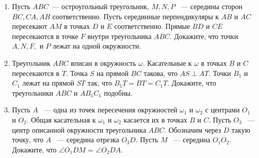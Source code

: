 \documentclass{article}
\begin{document}
\begin{enumerate}[label*=\protect\fbox{\arabic{enumi}}]
\item Пусть $ ABC $~--- остроугольный треугольник, $  M, N, P $ ~--- середины сторон $ BC, CA, AB  $ соответственно. Пусть серединные перпендикуляры к $ AB $ и $ AC $ пересекают $ AM $ в точках $ D $ и $ E $ соответственно. Прямые $ BD $ и $ CE $ пересекаются в точке $ F $ внутри треугольника $ ABC $. Докажите, что точки $ A, N, F,  $ и $ P $ лежат на одной окружности.
\item Треугольник $ ABC $ вписан в окружность $\omega$. Касательные к $\omega$ в точках $ B $ и $ C $ пересекаются в $ T $. Точка $ S $ на прямой $ BC $ такова, что $ AS \perp AT $. Точки $ B_1 $ и $ C_1 $ лежат на прямой $ ST $ так, что $ B_1T  = BT = C_1T$. Докажите, что треугольники $ ABC $ и $ AB_1C_1 $ подобны.
\item Пусть $ A $ ~--- одна из точек пересечения окружностей $ \omega_1 $ и $ \omega_2 $ с центрами $ O_1 $ и $ O_2 $. Общая касательная к $\omega_1$ и $\omega_2$ касается их в точках $ B $ и $ C $. Пусть $ O_3 $ ~--- центр описанной окружности треугольника $ ABC $. Обозначим через $ D $ такую точку, что $ A $ ~--- середина отрезка $ O_3D $. Пусть $ M $ ~--- середина $ O_1O_2 $. Докажите, что $ \angle O_1DM $ = $ \angle O_2DA $.
\end{enumerate}
\end{document}
